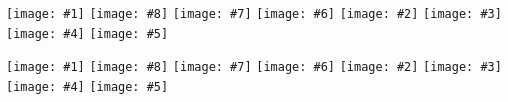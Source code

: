 \documentclass{article}
\newcommand{\zine}[8]{%
	\thispagestyle{empty}		
	\centering
	\texttt{[image: \#1]} %
	\hfill
	\texttt{[image: \#8]} %
	\hfill
	\texttt{[image: \#7]} %
	\hfill
	\texttt{[image: \#6]} %
	\texttt{[image: \#2]} %
	\hfill
	\texttt{[image: \#3]} %
	\hfill
	\texttt{[image: \#4]} %
	\hfill
	\texttt{[image: \#5]} %
}%
\begin{document}
	\zine{0 Cover 0 .pdf}{0 [2, 2, 5, 2] .pdf}{0 [3, 4, 2, 3] .pdf}{0 [5, 5, 1, 1] .pdf}{0 [1, 3, 3, 0] .pdf}{0 [0, 1, 4, 4] .pdf}{0 [4, 0, 0, 5] .pdf}{0 Back [308, 335, 657, 294] [[2, 2, 5, 2], [3, 4, 2, 3], [5, 5, 1, 1], [1, 3, 3, 0], [0, 1, 4, 4], [4, 0, 0, 5]] .pdf}
	\zine{1 Cover 1 .pdf}{1 [1, 2, 0, 0] .pdf}{1 [2, 0, 2, 1] .pdf}{1 [0, 1, 1, 2] .pdf}{1 blank .pdf}{1 blank .pdf}{1 blank .pdf}{1 Back [3, 4, 1, 0] [[1, 2, 0, 0], [2, 0, 2, 1], [0, 1, 1, 2]] .pdf}
\end{document}
